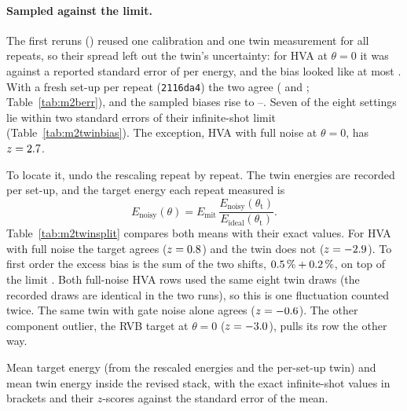 \paragraph{Sampled against the limit.} The first reruns () reused one calibration and
one twin measurement for all repeats, so their spread left out the twin's uncertainty: for HVA
at $\theta=0$ it was \VMoHvaFullZeroRoSymTwinSpread{} against a reported standard error of
\VMoHvaFullZeroRoSymTwinSe{} per energy, and the bias looked like at most \VMoMaxRoSymTwin. With
a fresh set-up per repeat (\texttt{2116da4}) the two agree (\VMbHvaFullZeroRoSymTwinSpread{}
and \VMbHvaFullZeroRoSymTwinSe; Table~\ref{tab:m2berr}), and the sampled biases rise to
\VMbRoSymTwinMin{}--\VMbRoSymTwinMax. Seven of the eight settings lie within two standard errors
of their infinite-shot limit (Table~\ref{tab:m2twinbias}). The exception, HVA with full noise at
$\theta=0$, has $z=2.7$.

To locate it, undo the rescaling repeat by repeat. The twin energies are recorded per set-up,
and the target energy each repeat measured is
\[
  E_{\mathrm{noisy}}(\theta)=E_{\mathrm{mit}}\,\frac{E_{\mathrm{noisy}}(\theta_{\mathrm t})}{E_{\mathrm{ideal}}(\theta_{\mathrm t})} .
\] Table~\ref{tab:m2twinsplit} compares both means
with their exact values. For HVA with full noise the target agrees ($z=0.8$)
and the twin does not ($z=-2.9$). To first order the excess bias is the sum of
the two shifts, $0.5\,\%+0.2\,\%$, on top of the limit
\VMxTwHvaZeroFullCtfRel. Both full-noise HVA rows used the same eight twin draws (the recorded
draws are identical in the two runs), so this is one fluctuation counted twice. The same twin
with gate noise alone agrees ($z=-0.6$). The other component outlier, the RVB
target at $\theta=0$ ($z=-3.0$), pulls its row the other way.

\begin{table}[H]
  \centering
  \small
  \begin{adjustbox}{max width=\linewidth}
    
  \end{adjustbox}
  \caption{Mean target energy (from the rescaled energies and the per-set-up twin) and mean twin
    energy inside the revised stack, with the exact infinite-shot values in brackets and their
    $z$-scores against the standard error of the mean.}
  \label{tab:m2twinsplit}
\end{table}

